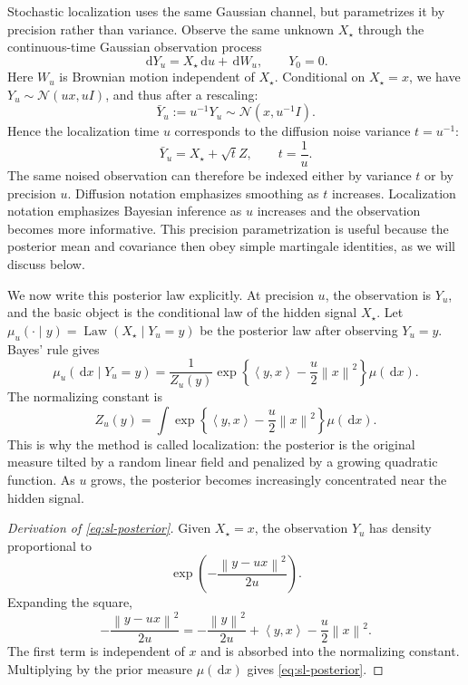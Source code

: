 \documentclass{amsart}
\numberwithin{equation}{section}
\theoremstyle{plain}
\theoremstyle{definition}
\theoremstyle{remark}
\DeclareMathOperator{\Law}{Law}
\newcommand{\dd}{\,\mathrm{d}}
\newcommand{\Id}{I}
\newcommand{\norm}[1]{\left\lVert #1 \right\rVert}
\newcommand{\ip}[2]{\left\langle #1,#2 \right\rangle}
\newcommand{\normal}[2]{\mathcal{N}\!\left(#1,#2\right)}
\begin{document}
Stochastic localization uses the same Gaussian channel, but parametrizes it by
precision rather than variance.  Observe the same unknown $X_\star$ through
the continuous-time Gaussian observation process
\begin{equation}\label{eq:sl-observation}
    \dd Y_u=X_\star\dd u+\dd W_u,\qquad Y_0=0.
\end{equation}
Here $W_u$ is Brownian motion independent of $X_\star$.  Conditional on
$X_\star=x$, we have $Y_u\sim\normal{ux}{u\Id}$, and thus after a rescaling:
\[
    \bar Y_u:=u^{-1}Y_u\sim\normal{x}{u^{-1}\Id}.
\]
Hence the localization time $u$ corresponds to the diffusion noise variance
$t=u^{-1}$:
\[
    \bar Y_u=X_\star+\sqrt{t}Z,
    \qquad t=\frac1u.
\]
The same noised observation can therefore be indexed either by variance
$t$ or by precision $u$.  Diffusion notation emphasizes smoothing as
$t$ increases.  Localization notation emphasizes Bayesian inference as
$u$ increases and the observation becomes more informative.  This precision
parametrization is useful because the posterior mean and covariance then obey
simple martingale identities, as we will discuss below.

We now write this posterior law explicitly.  At precision $u$, the
observation is $Y_u$, and the basic object is the conditional law of the hidden
signal $X_\star$.  Let
$\mu_u(\cdot \mid y)=\Law(X_\star\mid Y_u = y)$ be the posterior law after
observing $Y_u = y$.  Bayes' rule gives
\begin{equation}\label{eq:sl-posterior}
    \mu_{u}(\dd x \mid Y_u = y)
    =
    \frac{1}{Z_u(y)}
    \exp\left\{\ip{y}{x}-\frac{u}{2}\norm{x}^2\right\}\mu(\dd x).
\end{equation}
The normalizing constant is
\[
    Z_u(y)=
    \int
    \exp\left\{\ip{y}{x}-\frac{u}{2}\norm{x}^2\right\}\mu(\dd x).
\]
This is why the method is called localization: the posterior is the original
measure tilted by a random linear field and penalized by a growing quadratic
function.
As $u$ grows, the posterior becomes increasingly concentrated near the hidden
signal.

\begin{proof}[Derivation of \eqref{eq:sl-posterior}]
Given $X_\star=x$, the observation $Y_u$ has density proportional to
\[
    \exp\left(-\frac{\norm{y-ux}^2}{2u}\right).
\]
Expanding the square,
\[
    -\frac{\norm{y-ux}^2}{2u}
    =
    -\frac{\norm{y}^2}{2u}
    +\ip{y}{x}
    -\frac{u}{2}\norm{x}^2.
\]
The first term is independent of $x$ and is absorbed into the normalizing
constant.  Multiplying by the prior measure $\mu(\dd x)$ gives
\eqref{eq:sl-posterior}.
\end{proof}
\end{document}
